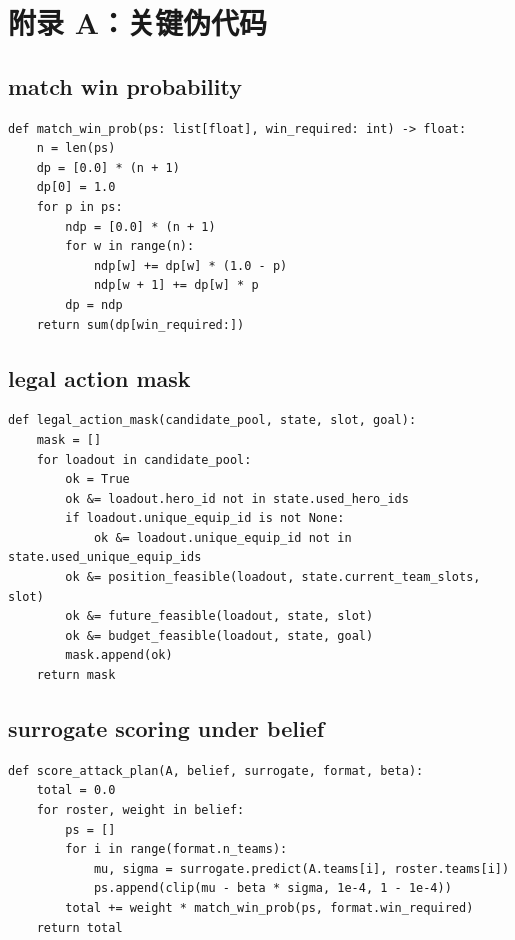 \documentclass[UTF8,12pt,openany]{ctexbook}
\begin{document}
\chapter{附录 A：关键伪代码}

\section{match win probability}
\begin{lstlisting}[caption={BO3/BO5 通用胜率 DP}]
def match_win_prob(ps: list[float], win_required: int) -> float:
    n = len(ps)
    dp = [0.0] * (n + 1)
    dp[0] = 1.0
    for p in ps:
        ndp = [0.0] * (n + 1)
        for w in range(n):
            ndp[w] += dp[w] * (1.0 - p)
            ndp[w + 1] += dp[w] * p
        dp = ndp
    return sum(dp[win_required:])
\end{lstlisting}

\section{legal action mask}
\begin{lstlisting}[caption={生成端 legal action mask}]
def legal_action_mask(candidate_pool, state, slot, goal):
    mask = []
    for loadout in candidate_pool:
        ok = True
        ok &= loadout.hero_id not in state.used_hero_ids
        if loadout.unique_equip_id is not None:
            ok &= loadout.unique_equip_id not in state.used_unique_equip_ids
        ok &= position_feasible(loadout, state.current_team_slots, slot)
        ok &= future_feasible(loadout, state, slot)
        ok &= budget_feasible(loadout, state, goal)
        mask.append(ok)
    return mask
\end{lstlisting}

\section{surrogate scoring under belief}
\begin{lstlisting}[caption={belief 下的进攻估分}]
def score_attack_plan(A, belief, surrogate, format, beta):
    total = 0.0
    for roster, weight in belief:
        ps = []
        for i in range(format.n_teams):
            mu, sigma = surrogate.predict(A.teams[i], roster.teams[i])
            ps.append(clip(mu - beta * sigma, 1e-4, 1 - 1e-4))
        total += weight * match_win_prob(ps, format.win_required)
    return total
\end{lstlisting}
\end{document}

